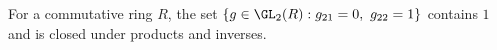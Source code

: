 For a commutative ring $R$, the set $\{g\in\GL_2(R):g_{21}=0,\ g_{22}=1\}$ contains $1$ and is closed under products and inverses.
